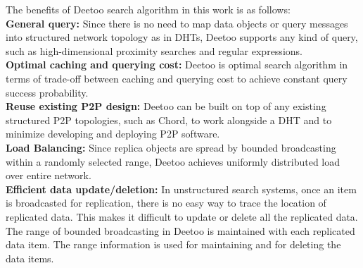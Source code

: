 \documentclass[9.5pt,journal,final,finalsubmission,twocolumn]{IEEEtran}
\begin{document}
The benefits of Deetoo search algorithm in this work is as follows:\\ 
{\bf General query:} Since there is no need to map data objects or query 
messages into structured network topology as in DHTs, Deetoo supports
any kind of query, such as high-dimensional proximity searches and regular 
expressions.\\
{\bf Optimal caching and querying cost:} Deetoo is optimal search algorithm
in terms of trade-off between caching and querying cost to achieve 
constant query success probability.\\
{\bf Reuse existing P2P design:}
Deetoo can be built on top of any existing structured P2P topologies, such as
Chord, to work alongside a DHT and to minimize developing and deploying P2P 
software.\\
{\bf Load Balancing:} 
Since replica objects are spread by bounded broadcasting within 
a randomly selected range, Deetoo achieves uniformly distributed 
load over entire network. \\
{\bf Efficient data update/deletion:} In unstructured search systems, 
once an item is broadcasted for replication, 
there is no easy way to trace the location of replicated data. 
This makes it difficult to update or delete all the replicated data.
The range of bounded broadcasting in Deetoo is maintained with 
each replicated data item.  
The range information is used for maintaining
and for deleting the data items.
\end{document}
